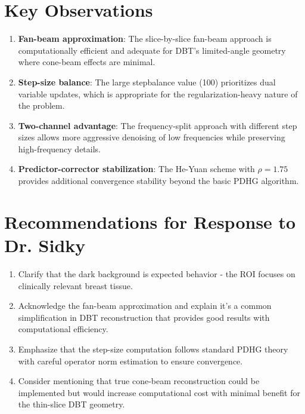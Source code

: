 \documentclass[11pt]{article}
\begin{document}
\section{Key Observations}

\begin{enumerate}
    \item \textbf{Fan-beam approximation}: The slice-by-slice fan-beam approach is computationally efficient and adequate for DBT's limited-angle geometry where cone-beam effects are minimal.
    
    \item \textbf{Step-size balance}: The large stepbalance value (100) prioritizes dual variable updates, which is appropriate for the regularization-heavy nature of the problem.
    
    \item \textbf{Two-channel advantage}: The frequency-split approach with different step sizes allows more aggressive denoising of low frequencies while preserving high-frequency details.
    
    \item \textbf{Predictor-corrector stabilization}: The He-Yuan scheme with $\rho = 1.75$ provides additional convergence stability beyond the basic PDHG algorithm.
\end{enumerate}

\section{Recommendations for Response to Dr. Sidky}

\begin{enumerate}
    \item Clarify that the dark background is expected behavior - the ROI focuses on clinically relevant breast tissue.
    
    \item Acknowledge the fan-beam approximation and explain it's a common simplification in DBT reconstruction that provides good results with computational efficiency.
    
    \item Emphasize that the step-size computation follows standard PDHG theory with careful operator norm estimation to ensure convergence.
    
    \item Consider mentioning that true cone-beam reconstruction could be implemented but would increase computational cost with minimal benefit for the thin-slice DBT geometry.
\end{enumerate}
\end{document}
